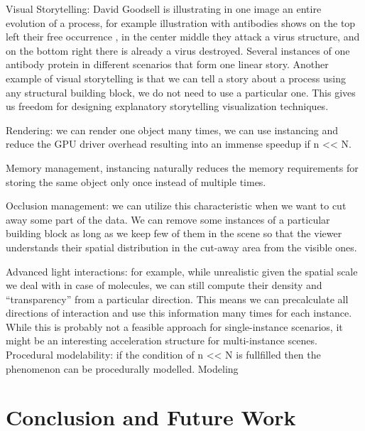 Visual Storytelling: David Goodsell is illustrating in one image an entire evolution of a process, for example illustration with antibodies shows on the top left their free occurrence , in the center middle they attack a virus structure, and on the bottom right there is already a virus destroyed. Several instances of one antibody protein in different scenarios that form one linear story.
Another example of visual storytelling is that we can tell a story about a process using any structural building block, we do not need to use a particular one. This gives us freedom for designing explanatory storytelling visualization techniques.

Rendering: we can render one object many times, we can use instancing and reduce the GPU driver overhead resulting into an immense speedup if n << N.

Memory management, instancing naturally reduces the memory requirements for storing the same object only once instead of multiple times.

Occlusion management: we can utilize this characteristic when we want to cut away some part of the data. We can remove some instances of a particular building block as long as we keep few of them in the scene so that the viewer understands their spatial distribution in the cut-away area from the visible ones.

Advanced light interactions: for example, while unrealistic given the spatial scale we deal with in case of molecules, we can still compute their density and “transparency” from a particular direction. This means we can precalculate all directions of interaction and use this information many times for each instance. While this is probably not a feasible approach for single-instance scenarios, it might be an interesting acceleration structure for multi-instance scenes.
Procedural modelability: if the condition of n << N is fullfilled then the phenomenon can be procedurally modelled. Modeling 

\section{Conclusion and Future Work}

